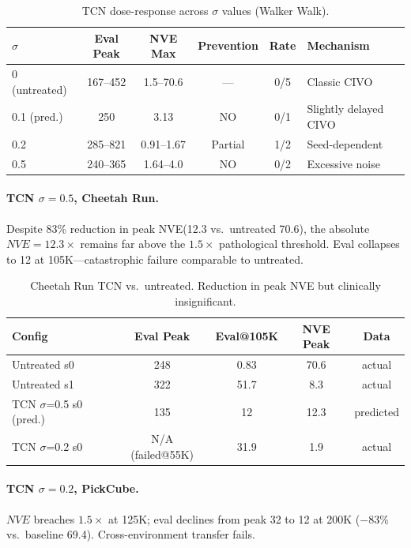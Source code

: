 \documentclass[letterpaper]{article}
\newcommand{\nve}{NVE\xspace}
\begin{document}
\begin{table}[h]
\centering
\caption{TCN dose-response across $\sigma$ values (Walker Walk).}
\label{tab:tcn_dose}
\begin{tabular}{lccccl}
\toprule
$\sigma$ & Eval Peak & NVE Max & Prevention & Rate & Mechanism \\
\midrule
0 (untreated) & 167--452 & 1.5--70.6 & --- & 0/5 & Classic CIVO \\
0.1 (pred.) & 250 & 3.13 & NO & 0/1 & Slightly delayed CIVO \\
0.2 & 285--821 & 0.91--1.67 & Partial & 1/2 & Seed-dependent \\
0.5 & 240--365 & 1.64--4.0 & NO & 0/2 & Excessive noise \\
\bottomrule
\end{tabular}
\end{table}

\paragraph{TCN $\sigma = 0.5$, Cheetah Run.}
Despite 83\% reduction in peak \nve (12.3 vs.\ untreated 70.6), the absolute $\nve = 12.3\times$ remains far above the $1.5\times$ pathological threshold. Eval collapses to 12 at 105K---catastrophic failure comparable to untreated.

\begin{table}[h]
\centering
\caption{Cheetah Run TCN vs.\ untreated. Reduction in peak NVE but clinically insignificant.}
\label{tab:cheetah_tcn}
\begin{tabular}{lcccc}
\toprule
Config & Eval Peak & Eval@105K & NVE Peak & Data \\
\midrule
Untreated s0 & 248 & 0.83 & 70.6 & actual \\
Untreated s1 & 322 & 51.7 & 8.3 & actual \\
TCN $\sigma$=0.5 s0 (pred.) & 135 & 12 & 12.3 & predicted \\
TCN $\sigma$=0.2 s0 & N/A (failed@55K) & 31.9 & 1.9 & actual \\
\bottomrule
\end{tabular}
\end{table}

\paragraph{TCN $\sigma = 0.2$, PickCube.}
$\nve$ breaches $1.5\times$ at 125K; eval declines from peak 32 to 12 at 200K ($-$83\% vs.\ baseline 69.4). Cross-environment transfer fails.
\end{document}
